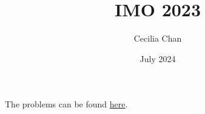 \documentclass{article}
\title{IMO 2023}
\author{Cecilia Chan}
\date{July 2024}
\begin{document}
\maketitle

The problems can be found \href{https://www.imo-official.org/problems.aspx}{here}.


 
\end{document}
